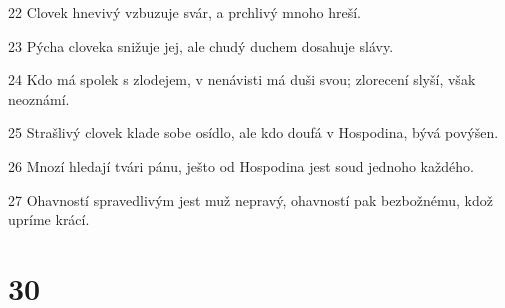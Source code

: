 \par 22 Clovek hnevivý vzbuzuje svár, a prchlivý mnoho hreší.
\par 23 Pýcha cloveka snižuje jej, ale chudý duchem dosahuje slávy.
\par 24 Kdo má spolek s zlodejem, v nenávisti má duši svou; zlorecení slyší, však neoznámí.
\par 25 Strašlivý clovek klade sobe osídlo, ale kdo doufá v Hospodina, bývá povýšen.
\par 26 Mnozí hledají tvári pánu, ješto od Hospodina jest soud jednoho každého.
\par 27 Ohavností spravedlivým jest muž nepravý, ohavností pak bezbožnému, kdož upríme krácí.

\chapter{30}

